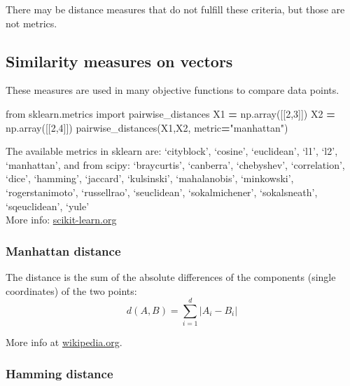 \documentclass[
]{book}
\newenvironment{Shaded}{\begin{snugshade}}{\end{snugshade}}
\newcommand{\DecValTok}[1]{\textcolor[rgb]{0.00,0.00,0.81}{#1}}
\newcommand{\ImportTok}[1]{#1}
\newcommand{\NormalTok}[1]{#1}
\newcommand{\OperatorTok}[1]{\textcolor[rgb]{0.81,0.36,0.00}{\textbf{#1}}}
\newcommand{\StringTok}[1]{\textcolor[rgb]{0.31,0.60,0.02}{#1}}
\begin{document}
There may be distance measures that do not fulfill these criteria, but
those are not metrics.

\hypertarget{similarity-measures-on-vectors}{%
\subsection{Similarity measures on vectors}\label{similarity-measures-on-vectors}}

These measures are used in many objective functions to compare data
points.

\begin{Shaded}
\begin{Highlighting}[]
\ImportTok{from}\NormalTok{ sklearn.metrics }\ImportTok{import}\NormalTok{ pairwise\_distances}
\NormalTok{X1 }\OperatorTok{=}\NormalTok{ np.array([[}\DecValTok{2}\NormalTok{,}\DecValTok{3}\NormalTok{]])}
\NormalTok{X2 }\OperatorTok{=}\NormalTok{ np.array([[}\DecValTok{2}\NormalTok{,}\DecValTok{4}\NormalTok{]])}
\NormalTok{pairwise\_distances(X1,X2, metric}\OperatorTok{=}\StringTok{"manhattan"}\NormalTok{)}
\end{Highlighting}
\end{Shaded}

The available metrics in sklearn are: `cityblock', `cosine',
`euclidean', `l1', `l2', `manhattan', and from scipy: `braycurtis',
`canberra', `chebyshev', `correlation', `dice', `hamming', `jaccard',
`kulsinski', `mahalanobis', `minkowski', `rogerstanimoto', `russellrao',
`seuclidean', `sokalmichener', `sokalsneath', `sqeuclidean', `yule'\\
More info:
\href{https://scikit-learn.org/stable/modules/generated/sklearn.metrics.pairwise_distances.html}{scikit-learn.org}

\hypertarget{manhattan-distance}{%
\subsubsection{Manhattan distance}\label{manhattan-distance}}

The distance is the sum of the absolute differences of the components
(single coordinates) of the two points:
\[d(A, B) = \sum_{i=1}^d | A_i - B_i |\]

More info at
\href{https://en.wikipedia.org/wiki/Taxicab_geometry}{wikipedia.org}.

\hypertarget{hamming-distance}{%
\subsubsection{Hamming distance}\label{hamming-distance}}
\end{document}
